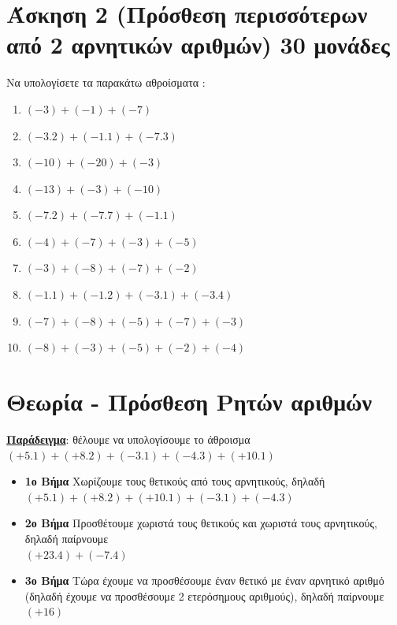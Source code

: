 \documentclass[a4paper,10pt]{report}
\begin{document}
\section*{Άσκηση 2 (Πρόσθεση περισσότερων από 2 αρνητικών αριθμών) \hfill \small{30 μονάδες}}
Να υπολογίσετε τα παρακάτω αθροίσματα :
\begin{enumerate}[1)]
 \item $(-3)+(-1)+(-7)$
 \item $(-3.2)+(-1.1)+(-7.3)$
 \item $(-10)+(-20)+(-3)$
 \item $(-13)+(-3)+(-10)$
 \item $(-7.2)+(-7.7)+(-1.1)$
 \item $(-4)+(-7)+(-3)+(-5)$
 \item $(-3)+(-8)+(-7)+(-2)$
 \item $(-1.1)+(-1.2)+(-3.1)+(-3.4)$
 \item $(-7)+(-8)+(-5)+(-7)+(-3)$
 \item $(-8)+(-3)+(-5)+(-2)+(-4)$
\end{enumerate}

\newpage
\section*{Θεωρία - Πρόσθεση Ρητών αριθμών\hfill \small{}}
\textbf{\underline{Παράδειγμα}}: θέλουμε να υπολογίσουμε το άθροισμα 
$(+5.1)+(+8.2)+(-3.1)+(-4.3)+(+10.1)$
\begin{itemize}
 \item \textbf{1ο Βήμα} Χωρίζουμε τους θετικούς από τους αρνητικούς, 
                        δηλαδή \\$(+5.1)+(+8.2)+(+10.1)+(-3.1)+(-4.3)$
 \item \textbf{2ο Βήμα} Προσθέτουμε χωριστά τους θετικούς και χωριστά τους αρνητικούς, δηλαδή παίρνουμε \\
                         $(+23.4)+(-7.4)$
 \item \textbf{3ο Βήμα} Τώρα έχουμε να προσθέσουμε έναν θετικό με έναν αρνητικό αριθμό 
                        (δηλαδή έχουμε να προσθέσουμε 2 ετερόσημους αριθμούς), δηλαδή παίρνουμε \\
                         $(+16)$
\end{itemize}
\end{document}
